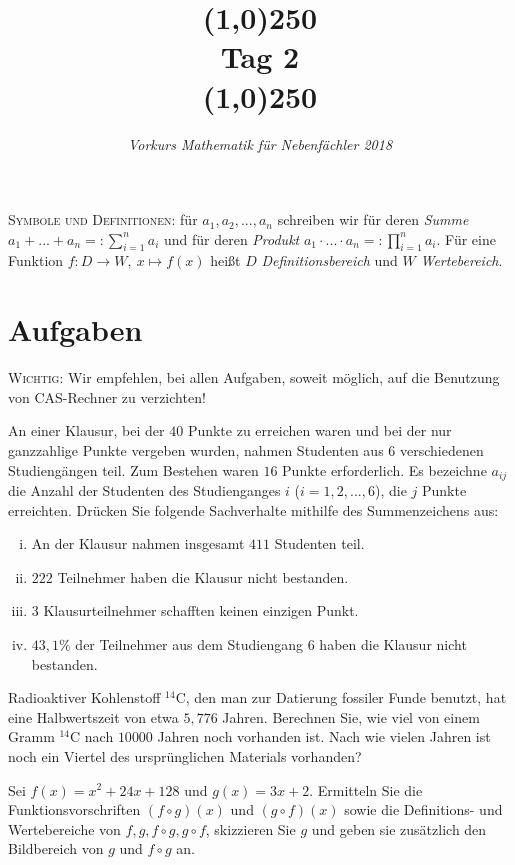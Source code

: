 \documentclass[11pt]{article}
\begin{document}
\title{\line(1,0){250}\\Tag 2\\\line(1,0){250}}
\date{}
\author{\itshape Vorkurs Mathematik für Nebenfächler 2018}
\maketitle
\begin{framed}
	\noindent \scriptsize
	\textsc{Symbole und Definitionen:} für $a_1,a_2,...,a_n$ schreiben wir für deren \emph{Summe} $a_1+...+a_n=:\sum_{i=1}^n a_i$ und für deren \emph{Produkt} $a_1\cdot...\cdot a_n =: \prod_{i=1}^n a_i$. Für eine Funktion $f:D\to W,~x\mapsto f(x)$ heißt $D$ \emph{Definitionsbereich} und $W$ \emph{Wertebereich}.
\end{framed}
\section*{Aufgaben}
\textsc{Wichtig:} Wir empfehlen, bei allen Aufgaben, soweit möglich, auf die Benutzung von CAS-Rechner zu verzichten!
\begin{task}
An einer Klausur, bei der $40$ Punkte zu erreichen waren und bei der nur ganzzahlige Punkte
vergeben wurden, nahmen Studenten aus $6$ verschiedenen Studieng\"angen teil. Zum Bestehen
waren $16$ Punkte erforderlich. Es bezeichne $a_{ij}$ die Anzahl der Studenten des Studienganges
$i$ ($i = 1, 2, . . ., 6$), die $j$ Punkte erreichten. Dr\"ucken Sie folgende Sachverhalte mithilfe des
Summenzeichens aus:
\begin{enumerate}[i)]
	\item An der Klausur nahmen insgesamt $411$ Studenten teil.
	\item $222$ Teilnehmer haben die Klausur nicht bestanden.
	\item $3$ Klausurteilnehmer schafften keinen einzigen Punkt.
	\item $43,1 \%$ der Teilnehmer aus dem Studiengang $6$ haben die Klausur nicht bestanden.
\end{enumerate}
\end{task}
\dotfill
\begin{task}
	Radioaktiver Kohlenstoff $^{14}$C, den man zur Datierung fossiler Funde
	benutzt, hat eine Halbwertszeit von etwa $5,776$ Jahren. Berechnen Sie, wie viel
	von einem Gramm $^{14}$C nach $10 000$ Jahren noch vorhanden ist. Nach wie vielen Jahren ist noch ein Viertel des ursprünglichen Materials vorhanden?
\end{task}
\dotfill
\begin{task}
Sei $f(x)=x^2+24x+128$ und $g(x)=3x+2$. Ermitteln Sie die Funktionsvorschriften $(f \circ g)(x)$ und $(g \circ f)(x)$ sowie die Definitions- und Wertebereiche von $f, g, f \circ g, g \circ f$, skizzieren Sie $g$ und geben sie zusätzlich den Bildbereich von $g$ und $f\circ g$ an. 
\end{task}
\end{document}
